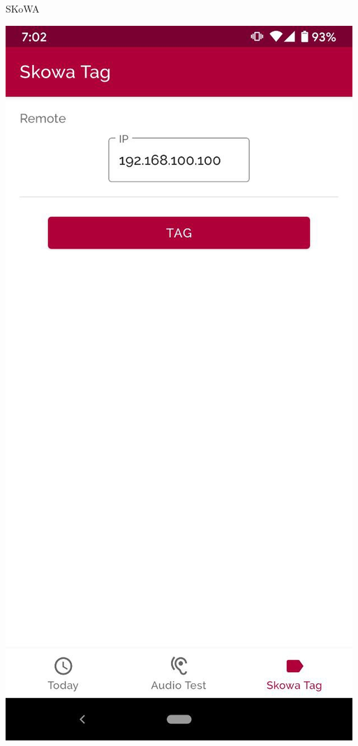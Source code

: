 \documentclass[aspectratio=169]{beamer}
\begin{document}
\begin{frame}{SKoWA}
  \begin{minipage}{.4\textwidth}
    \centering
    \includegraphics[height=.8\textheight]{../assets/android2}
  \end{minipage}%

\end{frame}
\end{document}
